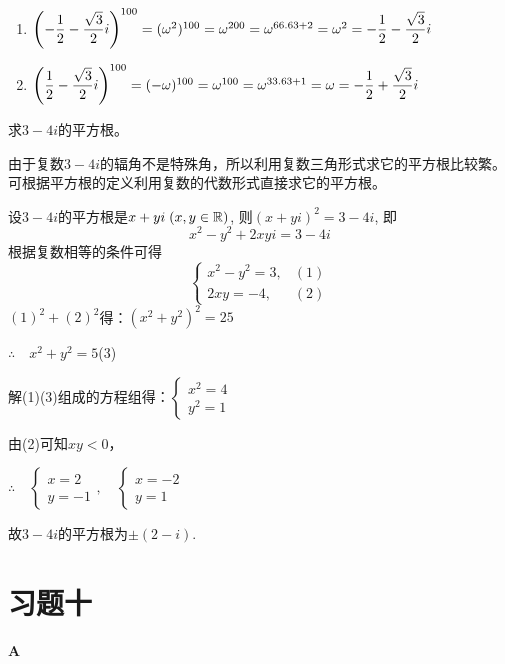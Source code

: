 \begin{solution}
\begin{enumerate}[(1)]
    \item $\left(-\dfrac{1}{2}-\dfrac{\sqrt{3}}{2}i\right)^{100}=(\omega^2)^{100}=\omega^{200}=\omega^{66.6 3+2}=\omega^2=-\dfrac{1}{2}-\dfrac{\sqrt{3}}{2}i$
    \item $\left(\dfrac{1}{2}-\dfrac{\sqrt{3}}{2}i\right)^{100}=(-\omega)^{100}=\omega^{100}=\omega^{33.6 3+1}=\omega=-\dfrac{1}{2}+\dfrac{\sqrt{3}}{2}i$
\end{enumerate}
\end{solution}

\begin{example}
    求$3-4i$的平方根。
\end{example}

\begin{analyze}
    由于复数$3-4i$的辐角不是特殊角，所以利用复数三角形式求它的平方根比较繁。可根据平方根的定义利用复数的代数形式直接求它的平方根。
\end{analyze}
    
\begin{solution}
设$3-4i$的平方根是$x+yi\; (x,y\in\mathbb{R})$, 
    则$(x+yi)^2=3-4i$,
    即\[x^2-y^2+2xyi=3-4i\]
    根据复数相等的条件可得
\[\begin{cases}
    x^2-y^2=3, & (1)\\
    2xy=-4,& (2)
\end{cases}\]
$(1)^2+(2)^2$得：$(x^2+y^2)^2=25$

$\therefore\quad x^2+y^2=5$\hfill(3)

解(1)(3)组成的方程组得：$\begin{cases}
    x^2=4\\ y^2=1
\end{cases}$

由(2)可知$xy<0$，

$\therefore\quad \begin{cases}
    x=2\\y=-1
\end{cases},\quad \begin{cases}
    x=-2\\y=1
\end{cases}$

故$3-4i$的平方根为$\pm(2-i)$.
\end{solution}

\section*{习题十}
\begin{center}
\bfseries A
\end{center}


